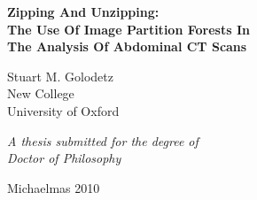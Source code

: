 \begin{titlepage}

\begin{center}

\vspace*{1cm}

\LARGE \textbf{Zipping And Unzipping:\\The Use Of Image Partition Forests In\\The Analysis Of Abdominal CT Scans}\\

\vspace{1cm}


\vspace{2mm}

\large Stuart M. Golodetz\\
\normalsize New College \\
\normalsize University of Oxford

\vspace{2.5cm}

\textit{A thesis submitted for the degree of\\Doctor of Philosophy}

\vspace{2mm}

Michaelmas 2010

\end{center}

\end{titlepage}
